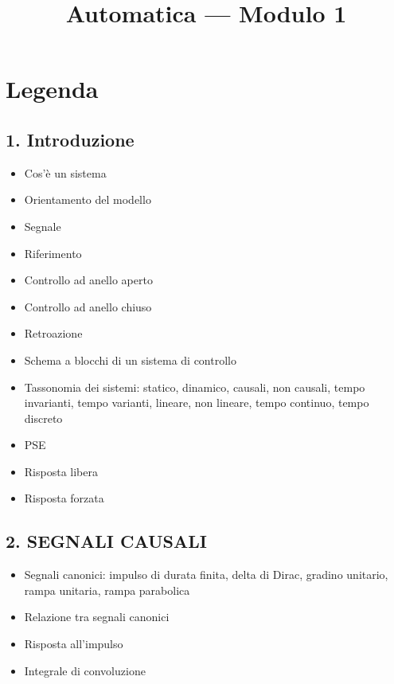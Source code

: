 \documentclass[11pt,a4paper]{article}
\begin{document}
\title{Automatica --- Modulo 1}\maketitle
\section*{Legenda}
\subsection*{1. Introduzione}
\begin{itemize}
\item Cos’è un sistema
\item Orientamento del modello
\item Segnale
\item Riferimento
\item Controllo ad anello aperto
\item Controllo ad anello chiuso
\item Retroazione
\item Schema a blocchi di un sistema di controllo
\item Tassonomia dei sistemi: statico, dinamico, causali, non causali, tempo invarianti, tempo varianti, lineare, non lineare, tempo continuo, tempo discreto
\item PSE
\item Risposta libera
\item Risposta forzata
\end{itemize}
\subsection*{2. SEGNALI CAUSALI}
\begin{itemize}
\item Segnali canonici: impulso di durata finita, delta di Dirac, gradino unitario, rampa unitaria, rampa parabolica
\item Relazione tra segnali canonici
\item Risposta all’impulso
\item Integrale di convoluzione
\end{itemize}
\end{document}

